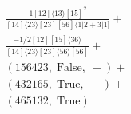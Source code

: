 \documentclass[varwidth, border=5pt]{standalone}
\begin{document}
\begin{my}
$\begin{gathered}
\scriptscriptstyle\frac{1[12]⟨13⟩[15]^2}{[14]⟨23⟩[23][56]⟨1|2+3|1]}+\\
\scriptscriptstyle\frac{-1/2[12][15]⟨36⟩}{[14]⟨23⟩[23]⟨56⟩[56]}+\\
\scriptscriptstyle(156423,\;\text{False},\;-)+\\
\scriptscriptstyle(432165,\;\text{True},\;-)+\\
\scriptscriptstyle(465132,\;\text{True})\phantom{+}
\end{gathered}$
\end{my}
\end{document}
